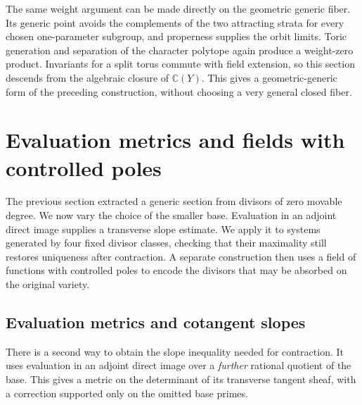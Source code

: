 \begin{remark}
The same weight argument can be made directly on the geometric generic
fiber. Its generic point avoids the complements of the two attracting
strata for every chosen one-parameter subgroup, and properness supplies
the orbit limits. Toric generation and separation of the character
polytope again produce a weight-zero product. Invariants for a split
torus commute with field extension, so this section descends from the
algebraic closure of \(\mathbb C(Y)\). This gives a geometric-generic
form of the preceding construction, without choosing a very general
closed fiber.
\end{remark}

\section{Evaluation metrics and fields with controlled poles}
\label{g:field-variants}

The previous section extracted a generic section from divisors of zero
movable degree. We now vary the choice of the smaller base. Evaluation
in an adjoint direct image supplies a transverse slope estimate.
We apply it to systems generated by four fixed divisor classes,
checking that their maximality still restores uniqueness after
contraction. A separate construction then uses a field of functions
with controlled poles to encode the divisors that may be absorbed
on the original variety.

\subsection{Evaluation metrics and cotangent slopes}
\label{g:cf:evaluation-subsection}

There is a second way to obtain the slope inequality needed for
contraction.  It uses evaluation in an adjoint direct image over a
\emph{further} rational quotient of the base.  This gives a metric on
the determinant of its transverse tangent sheaf, with a correction
supported only on the omitted base primes.

